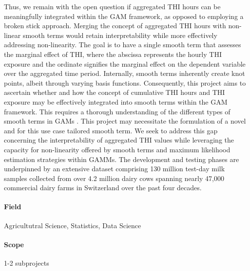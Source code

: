 Thus, we remain with the open question if aggregated THI hours can be meaningfully integrated within the GAM framework, as opposed to employing a broken stick approach. Merging the concept of aggregated THI hours with non-linear smooth terms would retain interpretability while more effectively addressing non-linearity. The goal is to have a single smooth term that assesses the marginal effect of THI, where the abscissa represents the hourly THI exposure and the ordinate signifies the marginal effect on the dependent variable over the aggregated time period. Internally, smooth terms inherently create knot points, albeit through varying basis functions. Consequently, this project aims to ascertain whether and how the concept of cumulative THI hours and THI exposure may be effectively integrated into smooth terms within the GAM framework. This requires a thorough understanding of the different types of smooth terms in GAMs \cite[page 195-248]{wood_generalized_2017}. This project may necessitate the formulation of a novel and for this use case tailored smooth term. We seek to address this gap concerning the interpretability of aggregated THI values while leveraging the capacity for non-linearity offered by smooth terms and maximum likelihood estimation strategies within GAMMs. The development and testing phases are underpinned by an extensive dataset comprising 130 million test-day milk samples collected from over 4.2 million dairy cows spanning nearly 47,000 commercial dairy farms in Switzerland over the past four decades.

\paragraph{Field} Agricultutral Science, Statistics, Data Science

\paragraph{Scope} 1-2 subprojects

